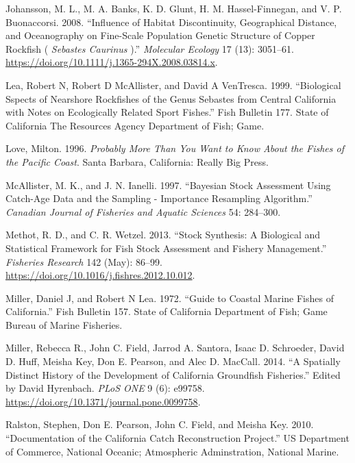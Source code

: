 \documentclass[11pt,
  english,
  a4paper,
]{article}
\begin{document}
\begin{cslreferences}
\leavevmode\hypertarget{ref-johansson_influence_2008}{}%
Johansson, M. L., M. A. Banks, K. D. Glunt, H. M. Hassel-Finnegan, and V. P. Buonaccorsi. 2008. ``Influence of Habitat Discontinuity, Geographical Distance, and Oceanography on Fine-Scale Population Genetic Structure of Copper Rockfish ( \emph{Sebastes Caurinus} ).'' \emph{Molecular Ecology} 17 (13): 3051--61. \url{https://doi.org/10.1111/j.1365-294X.2008.03814.x}.

\leavevmode\hypertarget{ref-lea_biological_1999}{}%
Lea, Robert N, Robert D McAllister, and David A VenTresca. 1999. ``Biological Sspects of Nearshore Rockfishes of the Genus Sebastes from Central California with Notes on Ecologically Related Sport Fishes.'' Fish Bulletin 177. State of California The Resources Agency Department of Fish; Game.

\leavevmode\hypertarget{ref-love_milton_probably_1996}{}%
Love, Milton. 1996. \emph{Probably More Than You Want to Know About the Fishes of the Pacific Coast}. Santa Barbara, California: Really Big Press.

\leavevmode\hypertarget{ref-mcallister_bayesian_1997}{}%
McAllister, M. K., and J. N. Ianelli. 1997. ``Bayesian Stock Assessment Using Catch-Age Data and the Sampling - Importance Resampling Algorithm.'' \emph{Canadian Journal of Fisheries and Aquatic Sciences} 54: 284--300.

\leavevmode\hypertarget{ref-methot_stock_2013}{}%
Methot, R. D., and C. R. Wetzel. 2013. ``Stock Synthesis: A Biological and Statistical Framework for Fish Stock Assessment and Fishery Management.'' \emph{Fisheries Research} 142 (May): 86--99. \url{https://doi.org/10.1016/j.fishres.2012.10.012}.

\leavevmode\hypertarget{ref-miller_guide_1972}{}%
Miller, Daniel J, and Robert N Lea. 1972. ``Guide to Coastal Marine Fishes of California.'' Fish Bulletin 157. State of California Department of Fish; Game Bureau of Marine Fisheries.

\leavevmode\hypertarget{ref-miller_spatially_2014}{}%
Miller, Rebecca R., John C. Field, Jarrod A. Santora, Isaac D. Schroeder, David D. Huff, Meisha Key, Don E. Pearson, and Alec D. MacCall. 2014. ``A Spatially Distinct History of the Development of California Groundfish Fisheries.'' Edited by David Hyrenbach. \emph{PLoS ONE} 9 (6): e99758. \url{https://doi.org/10.1371/journal.pone.0099758}.

\leavevmode\hypertarget{ref-ralston_documentation_2010}{}%
Ralston, Stephen, Don E. Pearson, John C. Field, and Meisha Key. 2010. ``Documentation of the California Catch Reconstruction Project.'' US Department of Commerce, National Oceanic; Atmospheric Adminstration, National Marine.


\end{cslreferences}
\end{document}

